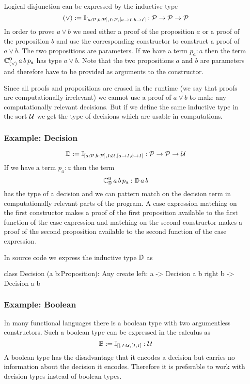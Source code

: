 Logical disjunction can be expressed by the inductive type
$$
(\lor)
:=
\mathbb{I}_{[a:{\cal{P}}, b:{\cal{P}}], I:{\cal{P}}, [a \to I, b \to I]}
:
{\cal{P}} \to {\cal{P}} \to {\cal{P}}
$$
%
In order to prove $a \lor b$ we need either a proof of the proposition $a$ or
a proof of the proposition $b$ and use the corresponding constructor to
construct a proof of $a \lor b$. The two propositions are parameters. If we
have a term $p_a: a$ then the term $\mathbb{C}^0_{(\lor)} \, a \, b \, p_a$ has
type $a \lor b$. Note that the two propositions $a$ and $b$ are parameters and
therefore have to be provided as arguments to the constructor.

Since all proofs and propositions are erased in the runtime (we say that
proofs are computationally irrelevant) we cannot use a proof of $a \lor b$ to
make any computationally relevant decisions. But if we define the same
inductive type in the sort ${\cal{U}}$ we get the type of decisions which are
usable in computations.


\subsubsection{Example: Decision}

$$
{\mathbb{D}}
:=
\mathbb{I}_{[a:{\cal{P}}, b:{\cal{P}}], I:{\cal{U}}, [a \to I, b \to I]}
:
{\cal{P}} \to {\cal{P}} \to {\cal{U}}
$$
If we have a term $p_a:a$ then the term
$$
\mathbb{C}^0_{\mathbb{D}} \, a \, b \, p_a
:
{\mathbb{D}} \, a \, b
$$
has the type of a decision and we can pattern match on the decision term in
computationally relevant parts of the program. A case expression matching on
the first constructor makes a proof of the first proposition available to the
first function of the case expression and matching on the second constructor
makes a proof of the second proposition available to the second function of
the case expression.

In source code we express the inductive type ${\mathbb{D}}$ as
%
\begin{alba}
  class Decision (a b:Proposition): Any create
    left:  a -> Decision a b
    right  b -> Decision a b
\end{alba}


\subsubsection{Example: Boolean}

In many functional languages there is a boolean type with two argumentless
constructors. Such a boolean type can be expressed in the calculus as
$$
{\mathbb{B}}
:=
\mathbb{I}_{[], I:{\cal{U}}, [I, I]}
:
{\cal{U}}
$$
A boolean type has the disadvantage that it encodes a decision but carries no
information about the decision it encodes. Therefore it is preferable to work
with decision types instead of boolean types.


